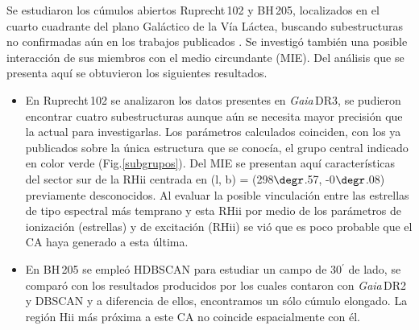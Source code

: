 \documentclass[baaa]{baaa}
\begin{document}
 Se estudiaron los c\'umulos abiertos Ruprecht\,102 y BH\,205, localizados en el cuarto cuadrante del plano Gal\'actico de la V\'ia L\'actea, buscando subestructuras no confirmadas a\'un en los trabajos publicados \citep{2019liu,miotrumpler24}. Se  investig\'o tambi\'en una posible interacci\'on de sus miembros con el medio circundante (MIE). Del an\'alisis que se presenta aqu\'i se obtuvieron los siguientes resultados.
\begin{itemize}
\item En Ruprecht\,102 se analizaron los datos presentes en \emph{Gaia}\,DR3, se pudieron encontrar cuatro subestructuras aunque a\'un se necesita mayor precisi\'on que la actual para investigarlas. Los par\'ametros calculados coinciden, con los ya publicados sobre la \'unica estructura que se conoc\'ia, el grupo central indicado en color verde (Fig.\ref{subgrupos}).
  Del MIE se presentan aqu\'i caracter\'isticas del sector sur de la RH{\sc ii} centrada en
 (l, b) = (298$\degr$.57, -0$\degr$.08) 
 previamente desconocidos. Al evaluar la posible vinculaci\'on entre las estrellas de tipo espectral m\'as temprano y esta RH{\sc ii} por medio de los par\'ametros de ionizaci\'on (estrellas) y de excitaci\'on (RH{\sc ii}) se  vi\'o que es poco probable que el CA haya generado a esta \'ultima. 
  \item En BH\,205 se emple\'o {\sc HDBSCAN} para estudiar un campo de 30${^\prime}$ de lado, se compar\'o con los resultados producidos por \cite{miotrumpler24} los cuales contaron con \emph{Gaia}\,DR2 y {\sc DBSCAN} y a diferencia de ellos, encontramos un sólo cúmulo elongado. La regi\'on H{\sc ii} m\'as pr\'oxima a este CA no coincide espacialmente con \'el. 
\end{itemize}
\end{document}
